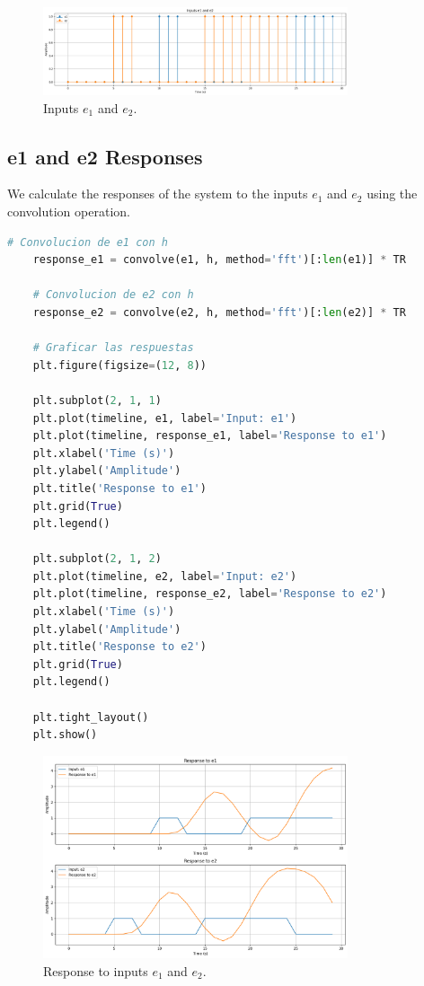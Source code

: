 \documentclass[10pt]{article}
\theoremstyle{definition}
\theoremstyle{remark}
\theoremstyle{definition}
\numberwithin{equation}{prob}
\begin{document}
\begin{figure}[H]
    \centering
    \includegraphics[width=0.8\textwidth]{./figures/Inputs e1 and e2.png}
    \caption{Inputs $e_1$ and $e_2$.}
\end{figure}

\subsection{e1 and e2 Responses}

We calculate the responses of the system to the inputs $e_1$ and $e_2$ using the convolution operation.

\begin{lstlisting}[language=Python]
    # Convolucion de e1 con h
    response_e1 = convolve(e1, h, method='fft')[:len(e1)] * TR
    
    # Convolucion de e2 con h
    response_e2 = convolve(e2, h, method='fft')[:len(e2)] * TR
    
    # Graficar las respuestas
    plt.figure(figsize=(12, 8))
    
    plt.subplot(2, 1, 1)
    plt.plot(timeline, e1, label='Input: e1')
    plt.plot(timeline, response_e1, label='Response to e1')
    plt.xlabel('Time (s)')
    plt.ylabel('Amplitude')
    plt.title('Response to e1')
    plt.grid(True)
    plt.legend()
    
    plt.subplot(2, 1, 2)
    plt.plot(timeline, e2, label='Input: e2')
    plt.plot(timeline, response_e2, label='Response to e2')
    plt.xlabel('Time (s)')
    plt.ylabel('Amplitude')
    plt.title('Response to e2')
    plt.grid(True)
    plt.legend()
    
    plt.tight_layout()
    plt.show()
\end{lstlisting}

\begin{figure}[H]
    \centering
    \includegraphics[width=0.8\textwidth]{./figures/Response Inputs e1 and e2.png}
    \caption{Response to inputs $e_1$ and $e_2$.}
\end{figure}
\end{document}
